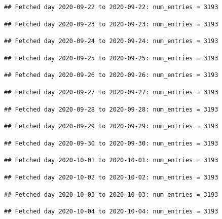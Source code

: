 \documentclass[]{article}
\begin{document}
\begin{verbatim}
## Fetched day 2020-09-22 to 2020-09-22: num_entries = 3193
\end{verbatim}

\begin{verbatim}
## Fetched day 2020-09-23 to 2020-09-23: num_entries = 3193
\end{verbatim}

\begin{verbatim}
## Fetched day 2020-09-24 to 2020-09-24: num_entries = 3193
\end{verbatim}

\begin{verbatim}
## Fetched day 2020-09-25 to 2020-09-25: num_entries = 3193
\end{verbatim}

\begin{verbatim}
## Fetched day 2020-09-26 to 2020-09-26: num_entries = 3193
\end{verbatim}

\begin{verbatim}
## Fetched day 2020-09-27 to 2020-09-27: num_entries = 3193
\end{verbatim}

\begin{verbatim}
## Fetched day 2020-09-28 to 2020-09-28: num_entries = 3193
\end{verbatim}

\begin{verbatim}
## Fetched day 2020-09-29 to 2020-09-29: num_entries = 3193
\end{verbatim}

\begin{verbatim}
## Fetched day 2020-09-30 to 2020-09-30: num_entries = 3193
\end{verbatim}

\begin{verbatim}
## Fetched day 2020-10-01 to 2020-10-01: num_entries = 3193
\end{verbatim}

\begin{verbatim}
## Fetched day 2020-10-02 to 2020-10-02: num_entries = 3193
\end{verbatim}

\begin{verbatim}
## Fetched day 2020-10-03 to 2020-10-03: num_entries = 3193
\end{verbatim}

\begin{verbatim}
## Fetched day 2020-10-04 to 2020-10-04: num_entries = 3193
\end{verbatim}
\end{document}
